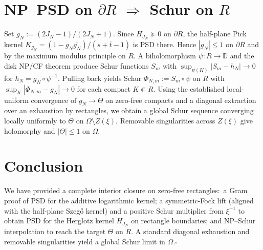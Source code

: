 \documentclass[11pt]{article}
\theoremstyle{remark}
\begin{document}
\section{NP--PSD on \(\partial R\) \(\Rightarrow\) Schur on \(R\)}
Set \(g_N:=(2J_N-1)/(2J_N+1)\). Since \(H_{J_N}\succeq 0\) on \(\partial R\), the half-plane Pick kernel \(K_{g_N}=(1-g_N\overline{g_N})/(s+\overline t-1)\) is PSD there. Hence \(|g_N|\le 1\) on \(\partial R\) and by the maximum modulus principle on \(R\). A biholomorphism \(\psi:R\to\mathbb D\) and the disk NP/CF theorem produce Schur functions \(S_m\) with \(\sup_{\psi(K)}|S_m-h_N|\to 0\) for \(h_N=g_N\circ\psi^{-1}\). Pulling back yields Schur \(\Phi_{N,m}:=S_m\circ\psi\) on \(R\) with \(\sup_K|\Phi_{N,m}-g_N|\to 0\) for each compact \(K\Subset R\). Using the established local-uniform convergence of \(g_N\to\Theta\) on zero-free compacts and a diagonal extraction over an exhaustion by rectangles, we obtain a global Schur sequence converging locally uniformly to \(\Theta\) on \(\Omega\setminus Z(\xi)\). Removable singularities across \(Z(\xi)\) give holomorphy and \(|\Theta|\le 1\) on \(\Omega\).

\section{Conclusion}
We have provided a complete interior closure on zero-free rectangles:\ a Gram proof of PSD for the additive logarithmic kernel; a symmetric-Fock lift (aligned with the half-plane Szeg\H{o} kernel) and a positive Schur multiplier from \(\xi^{-1}\) to obtain PSD for the Herglotz kernel \(H_{J_N}\) on rectangle boundaries; and NP--Schur interpolation to reach the target \(\Theta\) on \(R\). A standard diagonal exhaustion and removable singularities yield a global Schur limit in \(\Omega\).\hfill$\square$
\end{document}
